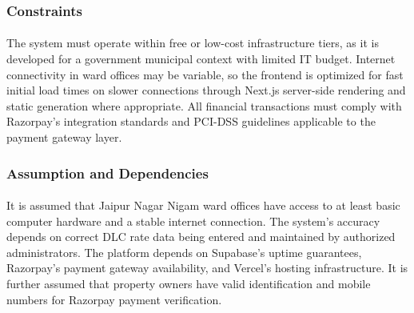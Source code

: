 \subsubsection{Constraints}
\paragraph{}The system must operate within free or low-cost infrastructure tiers, as it is developed for a government municipal context with limited IT budget. Internet connectivity in ward offices may be variable, so the frontend is optimized for fast initial load times on slower connections through Next.js server-side rendering and static generation where appropriate. All financial transactions must comply with Razorpay's integration standards and PCI-DSS guidelines applicable to the payment gateway layer.

\subsubsection{Assumption and Dependencies}
\paragraph{}It is assumed that Jaipur Nagar Nigam ward offices have access to at least basic computer hardware and a stable internet connection. The system's accuracy depends on correct DLC rate data being entered and maintained by authorized administrators. The platform depends on Supabase's uptime guarantees, Razorpay's payment gateway availability, and Vercel's hosting infrastructure. It is further assumed that property owners have valid identification and mobile numbers for Razorpay payment verification.
